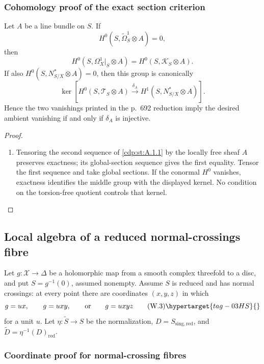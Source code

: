 \subsubsection*{Cohomology proof of the exact section criterion}


Let $A$ be a line bundle on $S$.  If
\[
H^0(S,\widetilde\Omega_S^1\otimes A)=0,
\]
then
\[
H^0(S,\Omega_X^1|_S\otimes A)
=H^0(S,\mathscr K_S\otimes A).
\]
If also $H^0(S,N^*_{S/X}\otimes A)=0$, then this group is canonically
\[
\ker\!\left[
H^0(S,\mathscr T_S\otimes A)
\xrightarrow{\delta_A}H^1(S,N^*_{S/X}\otimes A)
\right].
\]
Hence the two vanishings printed in the p.~692 reduction imply the desired
ambient vanishing if and only if $\delta_A$ is injective.



\begin{proof}
\begin{enumerate}[label={$\langle1\rangle$\arabic*.},leftmargin=*]
\item 
Tensoring the second sequence of
\cref{cdp:st:A.1.1} by the locally free sheaf $A$
preserves exactness; its global-section sequence gives the first equality.
Tensor the first sequence and take global sections.  If the conormal
$H^0$ vanishes, exactness identifies the middle group with the displayed
kernel.  No condition on the torsion-free quotient controls that kernel.

\end{enumerate}
\end{proof}

\subsection{Local algebra of a reduced normal-crossings fibre}

Let $g:\mathcal X\to\Delta$ be a holomorphic map from a smooth complex
threefold to a disc, and put $S=g^{-1}(0)$, assumed nonempty.  Assume $S$ is reduced and has
normal crossings: at every point there are coordinates $(x,y,z)$ in which
\[
g=ux,\qquad g=uxy,\qquad\text{or}\qquad g=uxyz
\tag{W.3}\hypertarget{tag-03HS}{}\label{wbII:eq:W:5.3}
\]
for a unit $u$.  Let $\eta:\widetilde S\to S$ be the normalization,
$D=S_{\mathrm{sing,red}}$, and $\widetilde D=\eta^{-1}(D)_{\mathrm{red}}$.

\subsubsection*{Coordinate proof for normal-crossing fibres}

